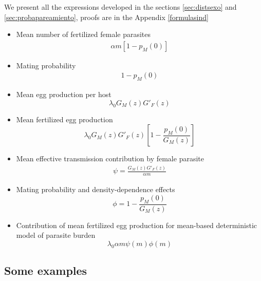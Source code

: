 \documentclass[12pt,a4paper]{article}
\theoremstyle{plain}%
\theoremstyle{definition}
\theoremstyle{remark}
\begin{document}
	
We present all the expressions developed in the sections \ref{sec:distsexo} and \ref{sec:probapareamiento}, proofs  are  in the Appendix \ref{formulasind}
	\begin{itemize}
		\item Mean number of fertilized female parasites
		\begin{align}
		\alpha m \left[1-p_M(0) \right] 
		\end{align}
		
		\item Mating probability 
		\begin{align}
		1-p_M(0) 
		\end{align}
		
		\item Mean egg production per host
		\begin{equation}
		\lambda_0G_M(z)G'_F(z)
		\end{equation}
		
		\item Mean fertilized egg production
		\begin{equation}
		\lambda_0 G_M(z) G'_F(z)\left[ 1-\frac{p_M(0)}{G_M(z)}\right]
		\end{equation}
		
		\item Mean effective transmission contribution by female parasite
		\begin{align}
		\psi=\frac{G_M(z)G'_F(z)}{\alpha m}
		\end{align}
		
		\item Mating probability and density-dependence effects
		\begin{equation}
		\phi= 1-\frac{p_M(0)}{G_M(z)}
		\end{equation}
		
		\item Contribution of mean fertilized egg production for mean-based deterministic model  of parasite burden
		 \begin{equation}
		\lambda_0 \alpha m \psi(m) \phi(m)
		\end{equation}
	\end{itemize}
	
	
\subsection{Some examples}
\end{document}
